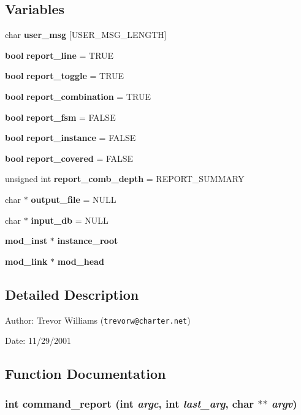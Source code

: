 \subsection*{Variables}
\begin{CompactItemize}
\item 
char {\bf user\_\-msg} [USER\_\-MSG\_\-LENGTH]
\item 
{\bf bool} {\bf report\_\-line} = TRUE
\item 
{\bf bool} {\bf report\_\-toggle} = TRUE
\item 
{\bf bool} {\bf report\_\-combination} = TRUE
\item 
{\bf bool} {\bf report\_\-fsm} = FALSE
\item 
{\bf bool} {\bf report\_\-instance} = FALSE
\item 
{\bf bool} {\bf report\_\-covered} = FALSE
\item 
unsigned int {\bf report\_\-comb\_\-depth} = REPORT\_\-SUMMARY
\item 
char $\ast$ {\bf output\_\-file} = NULL
\item 
char $\ast$ {\bf input\_\-db} = NULL
\item 
{\bf mod\_\-inst} $\ast$ {\bf instance\_\-root}
\item 
{\bf mod\_\-link} $\ast$ {\bf mod\_\-head}
\end{CompactItemize}


\subsection{Detailed Description}
\begin{Desc}
\item[Author:]Trevor Williams ({\tt trevorw@charter.net}) \end{Desc}
\begin{Desc}
\item[Date:]11/29/2001\end{Desc}


\subsection{Function Documentation}
\subsubsection{\setlength{\rightskip}{0pt plus 5cm}int command\_\-report (int {\em argc}, int {\em last\_\-arg}, char $\ast$$\ast$ {\em argv})}\label{report_8c_a19}


